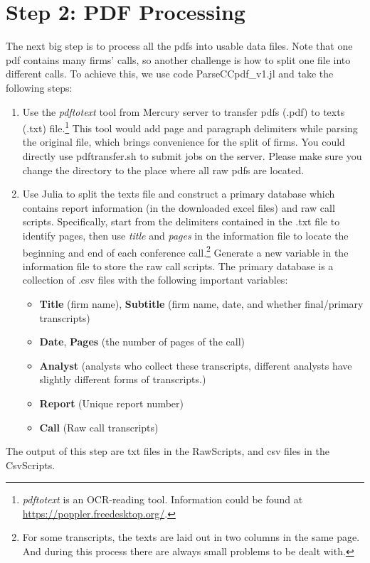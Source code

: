 \documentclass[11pt]{article}
\newcounter{file}
\begin{document}
\section{Step 2: PDF Processing}
\par The next big step is to process all the pdfs into usable data files. Note that one pdf contains many firms' calls, so another challenge is how to split one file into different calls.  To achieve this, we use code ParseCCpdf\_v1.jl and take the following steps:
\begin{enumerate}
	\item Use the \textit{pdftotext} tool from Mercury server to transfer pdfs (.pdf) to texts (.txt) file.\footnote{\textit{pdftotext} is an OCR-reading tool. Information could be found at \url{https://poppler.freedesktop.org/}.} This tool would add page and paragraph delimiters while parsing the original file, which brings convenience for the split of firms. You could directly use pdftransfer.sh to submit jobs on the server. Please make sure you change the directory to the place where all raw pdfs are located.
	\item Use Julia to split the texts file and construct a primary database which contains report information (in the downloaded excel files) and raw call scripts. Specifically, start from the delimiters contained in the .txt file to identify pages, then use \textit{title} and \textit{pages} in the information file to locate the beginning and end of each conference call.\footnote{For some transcripts, the texts are laid out in two columns in the same page. And during this process there are always small problems to be dealt with.} Generate a new variable in the information file to store the raw call scripts. The primary database is a collection of .csv files with the following important variables:
	\begin{itemize}
		\item \textbf{Title} (firm name), \textbf{Subtitle} (firm name, date, and whether final/primary transcripts)
		\item \textbf{Date}, \textbf{Pages} (the number of pages of the call)
		\item \textbf{Analyst} (analysts who collect these transcripts, different analysts have slightly different forms of transcripts.)
		\item \textbf{Report} (Unique report number)
		\item \textbf{Call} (Raw call transcripts)
	\end{itemize}
\end{enumerate}
\par The output of this step are txt files in the RawScripts, and csv files in the CsvScripts.
\end{document}
